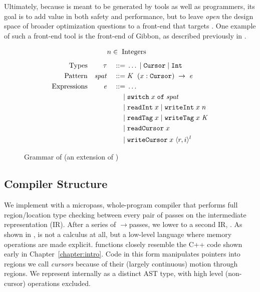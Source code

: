 \documentclass[showabstract,showacknowledgments,showpreface,showdedication]{iuphd}
\theoremstyle{nonumberplain}
\begin{document}
Ultimately, because \ourcalc is meant to be generated by tools as well as programmers,
its goal is to add value in both safety and performance, but to leave
\emph{open} the design space of broader optimization questions to a front-end that
targets \ourcalc{}. One example of such a front-end tool is the front-end of
Gibbon, as described previously in .

\begin{figure}
  \begin{displaymath}
    \begin{aligned}
      &n \in \; \textup{Integers}
    \end{aligned}
  \end{displaymath}
  \begin{displaymath}
    \begin{aligned}
      \textup{Types} && \mathit{\tau} && \; ::= \; & \ldots \; | \; \texttt{Cursor} \; | \; \texttt{Int} \\
      \textup{Pattern} && \mathit{spat} && \; ::= \; & \mathit{K} \; \;(x : \texttt{Cursor}) \;\rightarrow \;\mathit{e} \\
      \textup{Expressions} && \mathit{e} && \; ::= \; & \dots \\
      && && \; | \; & \texttt{switch}\; x \;\texttt{of}\;\mathit{spat}\\
      && && \; | \; & \texttt{\text{readInt}} \; x \; | \; \texttt{\text{writeInt}} \; x \; n \\
      && && \; | \; & \texttt{\text{readTag}} \; x \; | \; \texttt{\text{writeTag}} \; x \; \mathit{K} \\
      && && \; | \; & \texttt{\text{readCursor}} \; x \\
      && && \; | \; & \texttt{\text{writeCursor}} \; x \; \langle r, i \rangle ^{l} \\
    \end{aligned}
  \end{displaymath}
  \normalsize
  \caption{{Grammar of \lamcur{} (an extension of \ourcalc{}) \captionscrunch}}
  \label{fig:nocal-grammar}
\end{figure}

\subsection{Compiler Structure}\label{subsec:compiler_structure}
We implement \ourcalc with a micropass, whole-program compiler that performs
full region/location type checking
between every pair of passes on the \ourcalc intermediate representation (IR).
%
%
After a series of \ourcalc$\rightarrow$\ourcalc passes, we lower to a second IR,
\emph{\lamcur}.
As shown in ,
\lamcur is not a calculus at all, but a low-level language where
memory operations are made explicit.  \lamcur{} functions closely resemble the C++
code shown early in Chapter~\ref{chapter:intro}. 
%
Code in this form manipulates pointers into regions we call {\em cursors} because of
their (largely continuous) motion through regions.
%
{We represent \lamcur internally as a
  distinct AST type, with high level (non-cursor) operations excluded.}
\end{document}
